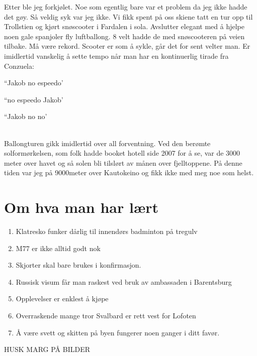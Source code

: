 Etter
ble jeg forkjølet. Noe som egentlig bare var et problem da jeg ikke
hadde det gøy. Så veldig syk var jeg ikke. Vi fikk spent på oss skiene
tatt en tur opp til Trollstien og kjørt snøscooter
i Fardalen i sola. Avslutter elegant med å  hjelpe noen gale spanjoler
fly luftballong. 8 velt hadde de med snøscooteren på veien tilbake. Må
være rekord. Scooter er som å sykle, går det for sent velter man. Er
imidlertid vanskelig å sette tempo når man har en kontinuerlig tirade
fra Conzuela:
\begin{dialogue}
	\item ``Jakob no espeedo'
	\item ``no espeedo Jakob'
	\item ``Jakob no no'
\end{dialogue}
\\

Ballongturen gikk imidlertid over all forventning. Ved den berømte
solformørkelsen, som folk hadde booket hotell side 2007 for å se, var
de 3000 meter over havet og så solen bli tilslørt av månen over
fjelltoppene. På denne tiden var
jeg på 9000meter over Kautokeino og fikk ikke med meg noe som helst. 


\section{Om hva man har lært}

\begin{enumerate}
	\item Klatresko funker dårlig til innendørs badminton på
		tregulv
	\item M77 er ikke alltid godt nok
	\item Skjorter skal bare brukes i konfirmasjon.
	\item Russisk visum får man raskest ved bruk av ambassaden i
		Barentsburg
	\item Opplevelser er enklest å kjøpe
	\item Overraskende mange tror Svalbard er rett vest for
		Lofoten
	\item Å være svett og skitten på byen fungerer noen ganger i
		ditt favør.
\end{enumerate}

HUSK MARG PÅ BILDER
